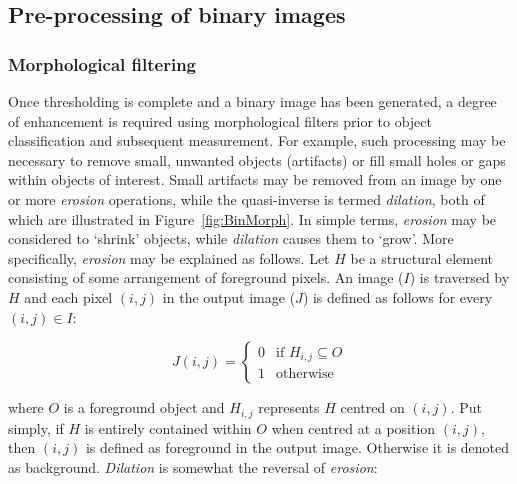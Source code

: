 \subsection{Pre-processing of binary images}\label{sec:BinPreProc}

\subsubsection{Morphological filtering}

Once thresholding is complete and a binary image has been generated, a degree of enhancement is required using morphological filters prior to object classification and subsequent measurement. For example, such processing may be necessary to remove small, unwanted objects (artifacts) or fill small holes or gaps within objects of interest. Small artifacts may be removed from an image by one or more \emph{erosion} operations, while the quasi-inverse is termed \emph{dilation}, both of which are illustrated in Figure~\ref{fig:BinMorph}. In simple terms, \emph{erosion} may be considered to \lq shrink' objects, while \emph{dilation} causes them to \lq grow'. More specifically, \emph{erosion} may be explained as follows. Let $H$ be a structural element consisting of some arrangement of foreground pixels. An image ($I$) is traversed by $H$ and each pixel $(i,j)$ in the output image ($J$) is defined as follows for every $(i,j) \in I$:

\begin{equation}
	J(i,j) = \begin{cases} 0 & \mbox{if } H_{i,j} \subseteq O\\
																			1 & \mbox{otherwise}
												\end{cases}
\end{equation}

\noindent where $O$ is a foreground object and $H_{i,j}$ represents $H$ centred on $(i,j)$.  Put simply, if $H$ is entirely contained within $O$ when centred at a position $(i,j)$, then $(i,j)$ is defined as foreground in the output image. Otherwise it is denoted as background. \emph{Dilation} is somewhat the reversal of \emph{erosion}:

